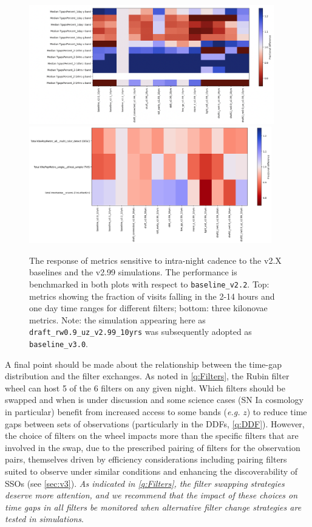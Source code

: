 \begin{figure}
\includegraphics[width=0.95\textwidth, right]{figures/tgaps.png}
\includegraphics[width=0.94\textwidth, right]{figures/kne.png}
\caption{The response of metrics sensitive to intra-night cadence to the v2.X baselines and the v2.99 simulations. The performance is benchmarked in both plots with respect to \texttt{baseline\_v2.2}. Top: metrics showing the fraction of visits falling in the 2-14 hours and one day time ranges for different filters; bottom: three kilonovae metrics. Note: the simulation appearing here as \texttt{draft\_rw0.9\_uz\_v2.99\_10yrs} was subsequently adopted as \texttt{baseline\_v3.0}.}
\label{fig:tgaps}
\end{figure}

A final point should be made about the relationship between the time-gap distribution and the filter exchanges. As noted in \autoref{q:Filters}, the Rubin filter wheel can host 5 of the 6 filters on any given night. Which filters should be swapped and when is under discussion and some science cases (SN Ia cosmology in particular) benefit from increased access to some bands (\emph{e.g.} $z$) to reduce time gaps between sets of observations (particularly in the DDFs, \autoref{q:DDF}). However, the choice of filters on the wheel impacts more than the specific filters that are involved in the swap, due to the prescribed pairing of filters for the observation pairs, themselves driven by efficiency considerations including pairing filters suited to observe under similar conditions and enhancing the discoverability of SSOs (see \autoref{sec:v3}). \emph{As indicated in \autoref{q:Filters}, the filter swapping strategies deserve more attention, and we recommend that the impact of these choices on time gaps in all filters be monitored when alternative filter change strategies are tested in simulations}.
